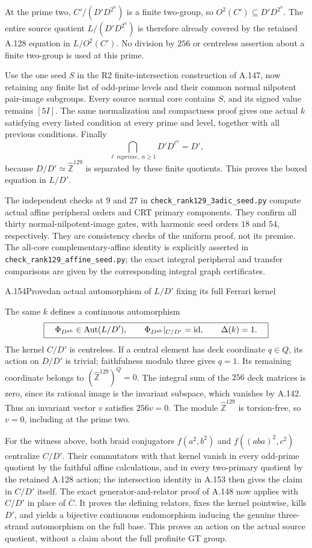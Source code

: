 At the prime two, $C'/(D'D^{2^n})$ is a finite
two-group, so
$O^2(C')\subseteq D'D^{2^n}$.  The entire source
quotient $L/(D'D^{2^n})$ is therefore already covered
by the retained A.128 equation in $L/O^2(C')$.
No division by $256$ or centreless assertion about a
finite two-group is used at this prime.

Use the one seed $S$ in the R2 finite-intersection
construction of A.147, now retaining any finite list
of odd-prime levels and their common normal nilpotent
pair-image subgroups.  Every source normal core
contains $S$, and its signed value remains $[5I]$.
The same normalization and compactness proof gives
one actual $k$ satisfying every listed condition at
every prime and level, together with all previous
conditions.  Finally
\[
 \bigcap_{\ell\ {
m prime},\ n\ge1}
         D'D^{\ell^n}=D',
\]
because $D/D'\simeq\widehat{\mathbb Z}^{129}$ is
separated by these finite quotients.  This proves the
boxed equation in $L/D'$.

The independent checks at $9$ and $27$ in
\texttt{check\_rank129\_3adic\_seed.py} compute actual
affine peripheral orders and CRT primary components.
They confirm all thirty normal-nilpotent-image gates,
with harmonic seed orders $18$ and $54$, respectively.
They are consistency checks of the uniform proof,
not its premise.  The all-core complementary-affine
identity is explicitly asserted in
\texttt{check\_rank129\_affine\_seed.py}; the exact
integral peripheral and transfer comparisons are
given by the corresponding integral graph certificates.

\begin{statement}{A.154}{Proved}{an actual automorphism of $L/D'$ fixing its full Ferrari kernel}
\end{statement}
The same $k$ defines a continuous automorphism
\[
 \boxed{\quad
 \Phi_{D^{\rm ab}}\in\operatorname{Aut}(L/D'),
 \qquad
 \Phi_{D^{\rm ab}}|_{C/D'}=\operatorname{id},
 \qquad\Delta(k)=1.\quad}
\]
The kernel $C/D'$ is centreless.  If a central element
has deck coordinate $q\in Q$, its action on
$D/D'$ is trivial; faithfulness modulo three gives
$q=1$.  Its remaining coordinate belongs to
$(\widehat{\mathbb Z}^{129})^Q=0$.  The integral sum of the $256$ deck matrices is zero,
since its rational image is the invariant subspace,
which vanishes by A.142. Thus an invariant vector $v$
satisfies $256v=0$. The module $\widehat{\mathbb Z}^{129}$
is torsion-free, so $v=0$, including at the prime two.

For the witness above, both braid conjugators
$f(a^2,b^2)$ and $f((aba)^2,c^2)$ centralize
$C/D'$.  Their commutators with that kernel vanish
in every odd-prime quotient by the faithful affine
calculations, and in every two-primary quotient by
the retained A.128 action; the intersection identity
in A.153 then gives the claim in $C/D'$ itself.
The exact generator-and-relator proof of A.148 now
applies with $C/D'$ in place of $\overline C$.
It proves the defining relators, fixes the kernel
pointwise, kills $D'$, and yields a bijective
continuous endomorphism inducing the genuine
three-strand automorphism on the full base.
This proves an action on the actual source quotient,
without a claim about the full profinite GT group.

